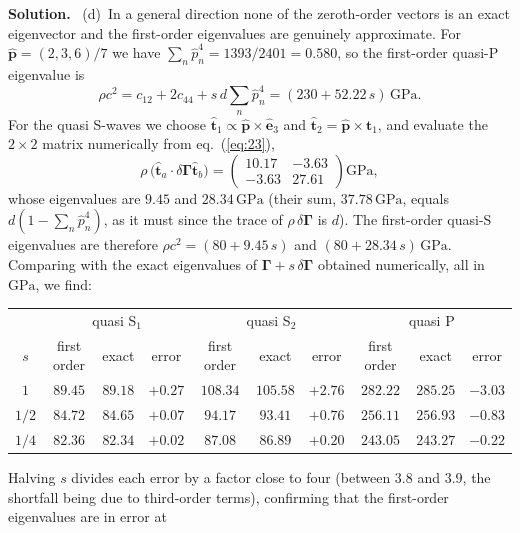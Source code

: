 \documentclass[a4paper,12pt]{paper}
\newenvironment{solution}{\par\noindent\textbf{Solution.}\ }{\par\medskip}
\begin{document}
\begin{solution}
(d)~In a general direction none of the zeroth-order vectors is an exact eigenvector and the
first-order eigenvalues are genuinely approximate. For $\hat{\mathbf{p}}=(2,3,6)/7$ we have
$\sum_{n}\hat{p}_{n}^{4}=1393/2401=0.580$, so the first-order quasi-P eigenvalue is
\begin{equation}
\rho c^{2}=c_{12}+2c_{44}+s\,d\sum_{n}\hat{p}_{n}^{4}=(230+52.22\,s)\,\mathrm{GPa}.
\label{eq:30}
\end{equation}
For the quasi S-waves we choose $\hat{\mathbf{t}}_{1}\propto\hat{\mathbf{p}}\times\hat{\mathbf{e}}_{3}$
and $\hat{\mathbf{t}}_{2}=\hat{\mathbf{p}}\times\hat{\mathbf{t}}_{1}$, and evaluate the
$2\times2$ matrix numerically from eq.~(\ref{eq:23}),
\begin{equation}
\rho\,\big(\hat{\mathbf{t}}_{a}\cdot\delta\bm{\Gamma}\hat{\mathbf{t}}_{b}\big)
=\begin{pmatrix}10.17&-3.63\\-3.63&27.61\end{pmatrix}\mathrm{GPa},
\label{eq:31}
\end{equation}
whose eigenvalues are $9.45$ and $28.34\,\mathrm{GPa}$ (their sum, $37.78\,\mathrm{GPa}$, equals
$d(1-\sum_{n}\hat{p}_{n}^{4})$, as it must since the trace of $\rho\,\delta\bm{\Gamma}$ is $d$).
The first-order quasi-S eigenvalues are therefore $\rho c^{2}=(80+9.45\,s)$ and
$(80+28.34\,s)\,\mathrm{GPa}$. Comparing with the exact eigenvalues of
$\bm{\Gamma}+s\,\delta\bm{\Gamma}$ obtained numerically, all in $\mathrm{GPa}$, we find:
\begin{center}
\small\setlength{\tabcolsep}{4pt}
\begin{tabular}{c|ccc|ccc|ccc}
 & \multicolumn{3}{c|}{quasi S$_{1}$} & \multicolumn{3}{c|}{quasi S$_{2}$} & \multicolumn{3}{c}{quasi P}\\
$s$ & first order & exact & error & first order & exact & error & first order & exact & error\\
\hline
$1$ & $89.45$ & $89.18$ & $+0.27$ & $108.34$ & $105.58$ & $+2.76$ & $282.22$ & $285.25$ & $-3.03$\\
$1/2$ & $84.72$ & $84.65$ & $+0.07$ & $94.17$ & $93.41$ & $+0.76$ & $256.11$ & $256.93$ & $-0.83$\\
$1/4$ & $82.36$ & $82.34$ & $+0.02$ & $87.08$ & $86.89$ & $+0.20$ & $243.05$ & $243.27$ & $-0.22$
\end{tabular}
\end{center}
Halving $s$ divides each error by a factor close to four (between $3.8$ and $3.9$, the shortfall
being due to third-order terms), confirming that the first-order eigenvalues are in error at

\end{solution}
\end{document}
